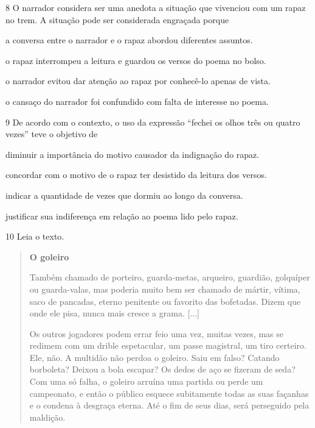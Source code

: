 \num{8} O narrador considera ser uma anedota a situação que vivenciou com um
rapaz no trem. A situação pode ser considerada engraçada porque

\begin{escolha}
\item a conversa entre o narrador e o rapaz abordou diferentes assuntos.

\item o rapaz interrompeu a leitura e guardou os versos do poema no bolso.

\item o narrador evitou dar atenção ao rapaz por conhecê-lo apenas de
vista.

\item o cansaço do narrador foi confundido com falta de interesse no poema.
\end{escolha}

\num{9} De acordo com o contexto, o uso da expressão ``fechei os olhos três ou
quatro vezes'' teve o objetivo de

\begin{escolha}
\item diminuir a importância do motivo causador da indignação do rapaz.

\item concordar com o motivo de o rapaz ter desistido da leitura dos
versos.

\item indicar a quantidade de vezes que dormiu ao longo da conversa.

\item justificar sua indiferença em relação ao poema lido pelo rapaz.
\end{escolha}

\num{10} Leia o texto.

\begin{quote}
\textbf{O goleiro}

Também chamado de porteiro, guarda-metas, arqueiro, guardião, golquíper
ou guarda-valas, mas poderia muito bem ser chamado de mártir, vítima,
saco de pancadas, eterno penitente ou favorito das bofetadas. Dizem que
onde ele pisa, nunca mais cresce a grama. {[}...{]}

Os outros jogadores podem errar feio uma vez, muitas vezes, mas se
redimem com um drible espetacular, um passe magistral, um tiro certeiro.
Ele, não. A multidão não perdoa o goleiro. Saiu em falso? Catando
borboleta? Deixou a bola escapar? Os dedos de aço se fizeram de seda?
Com uma só falha, o goleiro arruína uma partida ou perde um campeonato,
e então o público esquece subitamente todas as suas façanhas e o condena
à desgraça eterna. Até o fim de seus dias, será perseguido pela
maldição.

\end{quote}

